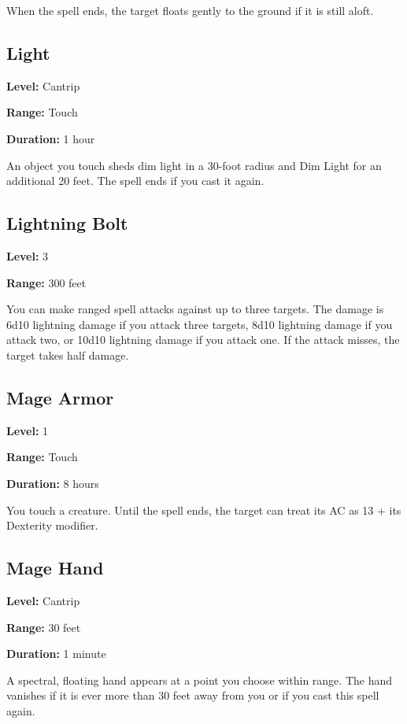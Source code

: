\documentclass[12pt,letterpaper,twocolumn,openany,nodeprecatedcode,bg=none]{dndbook}
\let\oldsubsection\subsection
\renewcommand{\subsection}[1]{%
  \needspace{5\baselineskip}%
  \oldsubsection{#1}%
}
\begin{document}
When the spell ends, the target floats gently to the ground if it is
still aloft.

\subsection{Light}\label{light}

\textbf{Level:} Cantrip

\textbf{Range:} Touch

\textbf{Duration:} 1 hour

An object you touch sheds dim light in a 30-foot radius and Dim Light
for an additional 20 feet. The spell ends if you cast it again.

\subsection{Lightning Bolt}\label{lightning-bolt}

\textbf{Level:} 3

\textbf{Range:} 300 feet

You can make ranged spell attacks against up to three targets. The
damage is 6d10 lightning damage if you attack three targets, 8d10
lightning damage if you attack two, or 10d10 lightning damage if you
attack one. If the attack misses, the target takes half damage.

\subsection{Mage Armor}\label{mage-armor}

\textbf{Level:} 1

\textbf{Range:} Touch

\textbf{Duration:} 8 hours

You touch a creature. Until the spell ends, the target can treat its AC
as 13 + its Dexterity modifier.

\subsection{Mage Hand}\label{mage-hand}

\textbf{Level:} Cantrip

\textbf{Range:} 30 feet

\textbf{Duration:} 1 minute

A spectral, floating hand appears at a point you choose within range.
The hand vanishes if it is ever more than 30 feet away from you or if
you cast this spell again.
\end{document}
